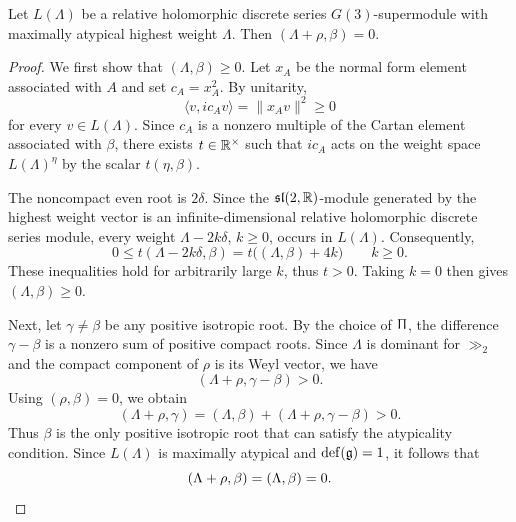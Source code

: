\begin{lemma}\label{lemm::G(3)_atyp}
    Let $L(\Lambda)$ be a relative holomorphic discrete series $G(3)$-supermodule with maximally atypical highest weight $\Lambda$. Then $(\Lambda+\rho,\beta)=0$.
\end{lemma}
\begin{proof}
We first show that $(\Lambda,\beta)\geq0$. Let $x_A$ be the normal form element associated with $A$ and set $c_A=x_A^2$. By unitarity,
\begin{equation*}
\langle v,ic_Av\rangle=\|x_Av\|^2\geq0
\end{equation*}
for every $v\in L(\Lambda)$. Since $c_A$ is a nonzero multiple of the Cartan element associated with $\beta$, there exists $t\in{\mathbb R}^\times$ such that $ic_A$ acts on the weight space $L(\Lambda)^{\eta}$ by the scalar $t(\eta,\beta)$.

The noncompact even root is $2\delta$. Since the ${\mathfrak{sl}}(2,{\mathbb R})$-module generated by the highest weight vector is an infinite-dimensional relative holomorphic discrete series module, every weight $\Lambda-2k\delta$, $k\geq0$, occurs in $L(\Lambda)$. Consequently,
\begin{equation*}
0\leq t(\Lambda-2k\delta,\beta)
=t\bigl((\Lambda,\beta)+4k\bigr)
\qquad k\geq0.
\end{equation*}
These inequalities hold for arbitrarily large $k$, thus $t>0$. Taking $k=0$ then gives $(\Lambda,\beta)\geq0$.

Next, let $\gamma\neq\beta$ be any positive isotropic root. By the choice of $\Uppi$, the difference $\gamma-\beta$ is a nonzero sum of positive compact roots. Since $\Lambda$ is dominant for $\gg_2$ and the compact component of $\rho$ is its Weyl vector, we have
\begin{equation*}
(\Lambda+\rho,\gamma-\beta)>0.
\end{equation*}
Using $(\rho,\beta)=0$, we obtain
\begin{equation*}
(\Lambda+\rho,\gamma)
=(\Lambda,\beta)+(\Lambda+\rho,\gamma-\beta)>0.
\end{equation*}
Thus $\beta$ is the only positive isotropic root that can satisfy the atypicality condition. Since $L(\Lambda)$ is maximally atypical and ${\mathrm{def}}({\mathfrak{g}})=1$, it follows that
\begin{equation*}
(\Lambda+\rho,\beta)=(\Lambda,\beta)=0.\qedhere
\end{equation*}
\end{proof}



